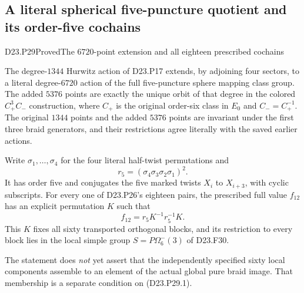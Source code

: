 \subsection{A literal spherical five-puncture quotient and its order-five cochains}

\begin{statement}{D23.P29}{Proved}{The $6720$-point extension and all eighteen prescribed cochains}
\end{statement}
The degree-$1344$ Hurwitz action of D23.P17 extends, by
adjoining four sectors, to a literal degree-$6720$ action
of the full five-puncture sphere mapping class group.
The added $5376$ points are exactly the unique orbit of
that degree in the colored $C_+^3C_-$ construction, where
$C_+$ is the original order-six class in $E_0$ and
$C_-=C_+^{-1}$. The original $1344$ points and the added
$5376$ points are invariant under the first three braid
generators, and their restrictions agree literally with
the saved earlier actions.

Write $\sigma_1,\ldots,\sigma_4$ for the four literal
half-twist permutations and
\[
                    r_5=(\sigma_4\sigma_3\sigma_2\sigma_1)^2.
\]
It has order five and conjugates the five marked twists
$X_i$ to $X_{i+3}$, with cyclic subscripts. For every
one of D23.P26's eighteen pairs, the prescribed full
value $f_{12}$ has an explicit permutation $K$ such that
\[
                    f_{12}=r_5K^{-1}r_5^{-1}K.
                                                        \tag{D23.P29.1}
\]
This $K$ fixes all sixty transported orthogonal blocks,
and its restriction to every block lies in the local
simple group $S=P\Omega^-_6(3)$ of D23.F30.

The statement does \emph{not} yet assert that the
independently specified sixty local components assemble
to an element of the actual global pure braid image.
That membership is a separate condition on (D23.P29.1).

